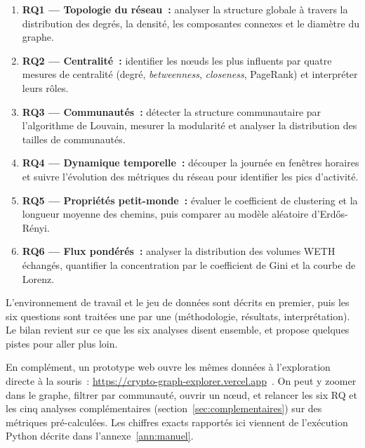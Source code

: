\begin{enumerate}
    \item \textbf{RQ1 --- Topologie du r\'eseau~:} analyser la structure globale
    \`a travers la distribution des degr\'es, la densit\'e, les composantes connexes
    et le diam\`etre du graphe.
    \item \textbf{RQ2 --- Centralit\'e~:} identifier les n\oe{}uds les plus
    influents par quatre mesures de centralit\'e (degr\'e, \textit{betweenness},
    \textit{closeness}, PageRank) et interpr\'eter leurs r\^oles.
    \item \textbf{RQ3 --- Communaut\'es~:} d\'etecter la structure communautaire
    par l'algorithme de Louvain, mesurer la modularit\'e et analyser la
    distribution des tailles de communaut\'es.
    \item \textbf{RQ4 --- Dynamique temporelle~:} d\'ecouper la journ\'ee en
    fen\^etres horaires et suivre l'\'evolution des m\'etriques du r\'eseau pour
    identifier les pics d'activit\'e.
    \item \textbf{RQ5 --- Propri\'et\'es petit-monde~:} \'evaluer le coefficient
    de clustering et la longueur moyenne des chemins, puis comparer au mod\`ele
    al\'eatoire d'Erd\H{o}s-R\'enyi.
    \item \textbf{RQ6 --- Flux pond\'er\'es~:} analyser la distribution des
    volumes WETH \'echang\'es, quantifier la concentration par le coefficient de
    Gini et la courbe de Lorenz.
\end{enumerate}

L'environnement de travail et le jeu de donn\'ees sont d\'ecrits en premier,
puis les six questions sont trait\'ees une par une (m\'ethodologie,
r\'esultats, interpr\'etation). Le bilan revient sur ce que les six analyses
disent ensemble, et propose quelques pistes pour aller plus loin.

En compl\'ement, un prototype web ouvre les m\^emes donn\'ees \`a
l'exploration directe \`a la souris~: \url{https://crypto-graph-explorer.vercel.app}~\cite{cryptographexplorer_web}.
On peut y zoomer dans le graphe, filtrer par communaut\'e, ouvrir un
n\oe{}ud, et relancer les six RQ et les cinq analyses compl\'ementaires
(section~\ref{sec:complementaires}) sur des m\'etriques pr\'e-calcul\'ees.
Les chiffres exacts rapport\'es ici viennent de l'ex\'ecution Python
d\'ecrite dans l'annexe~\ref{ann:manuel}.
